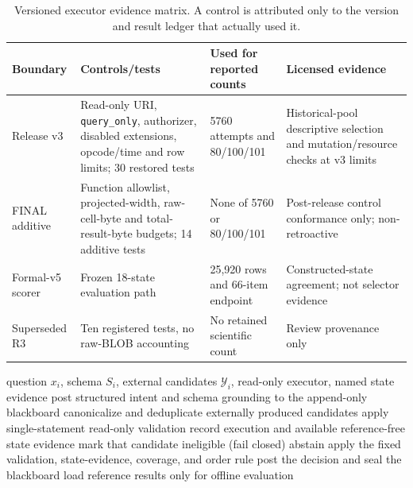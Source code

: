 \documentclass[applsci,article,submit,moreauthors]{Definitions/mdpi}
\begin{document}
\begin{table}[htbp]
\caption{Versioned executor evidence matrix. A control is attributed only to the version and result ledger that actually used it.}
\label{tab:version-evidence}\centering\small
\begin{tabular}{p{2.0cm}p{4.2cm}p{2.0cm}p{4.0cm}}
\toprule
Boundary & Controls/tests & Used for reported counts & Licensed evidence\\
\midrule
Release v3 & Read-only URI, \texttt{query\_only}, authorizer, disabled extensions, opcode/time and row limits; 30 restored tests & 5760 attempts and 80/100/101 & Historical-pool descriptive selection and mutation/resource checks at v3 limits\\
FINAL additive & Function allowlist, projected-width, raw-cell-byte and total-result-byte budgets; 14 additive tests & None of 5760 or 80/100/101 & Post-release control conformance only; non-retroactive\\
Formal-v5 scorer & Frozen 18-state evaluation path & 25,920 rows and 66-item endpoint & Constructed-state agreement; not selector evidence\\
Superseded R3 & Ten registered tests, no raw-BLOB accounting & No retained scientific count & Review provenance only\\
\bottomrule
\end{tabular}
\end{table}

\begin{algorithm}[htbp]
\caption{Gold-isolated deterministic coordination}
\label{alg:coordination}
\begin{algorithmic}[1]
\REQUIRE question $x_i$, schema $S_i$, external candidates $\mathcal{Y}_i$, read-only executor, named state evidence
\STATE post structured intent and schema grounding to the append-only blackboard
\STATE canonicalize and deduplicate externally produced candidates
  \STATE apply single-statement read-only validation
  \STATE record execution and available reference-free state evidence
\ENDFOR
{}
  \STATE mark that candidate ineligible (fail closed)
\ENDIF
{}
  \STATE abstain
\ELSE
  \STATE apply the fixed validation, state-evidence, coverage, and order rule
\ENDIF
\STATE post the decision and seal the blackboard
\STATE load reference results only for offline evaluation
\end{algorithmic}
\end{algorithm}
\end{document}
